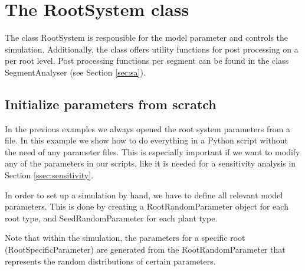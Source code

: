 \section{The RootSystem class} \label{sec:rs}

The class RootSystem is responsible for the model parameter and controls the simulation.
Additionally, the class offers utility functions for post processing on a per root level. 
Post processing functions per segment can be found in the class SegmentAnalyser (see Section \ref{sec:sa}).

\subsection{Initialize parameters from scratch} \label{sec:from_scratch}
 
In the previous examples we always opened the root system parameters from a file. 
In this example we show how to do everything in a Python script without the need of any parameter files. 
This is especially important if we want to modify any of the parameters in our scripts, 
like it is needed for a sensitivity analysis in Section \ref{ssec:sensitivity}.

In order to set up a simulation by hand, we have to define all relevant model parameters. 
This is done by creating a RootRandomParameter object for each root type, and 
SeedRandomParameter for each plant type. 

Note that within the simulation, the parameters for a specific root (RootSpecificParameter) 
are generated from the RootRandomParameter that represents the random distributions of certain parameters.



